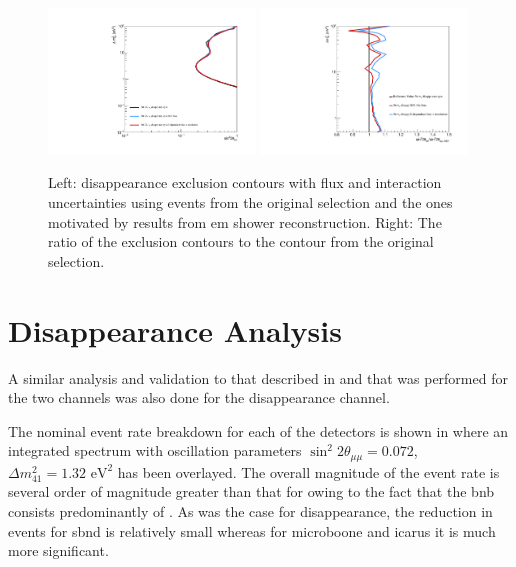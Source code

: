 \begin{figure}[h!]
    \centering
    \includegraphics[width = 0.49\textwidth]{figures-chap6/exclusion_contours/bias/nue_disapp_03d1.pdf}
    \includegraphics[width = 0.49\textwidth]{figures-chap6/exclusion_contours/bias/nue_disapp_03d1_ratio.pdf}
    \caption[\nue disappearance exclusion contours using events from the selection motivated by \gls{em} shower reconstruction.]{Left: \nue disappearance exclusion contours with flux and interaction uncertainties using events from the original selection and the ones motivated by results from \gls{em} shower reconstruction. Right: The ratio of the exclusion contours to the contour from the original selection.}
    \label{fig:nue_disapp_bias}
\end{figure}

\newpage
\section{\texorpdfstring{\numu Disappearance Analysis}{numu Disappearance Analysis}}

A similar analysis and validation to that described in   and  that was performed for the two \nue channels was also done for the \numu disappearance channel.

The nominal event rate breakdown for each of the detectors is shown in  where an integrated spectrum with oscillation parameters $\sin^2{2\theta_{\mu \mu}} = 0.072$, $\Delta m^2_{41} = 1.32 \text{ eV}^2$ has been overlayed. The overall magnitude of the event rate is several order of magnitude greater than that for \nue owing to the fact that the \gls{bnb} consists predominantly of \numu. As was the case for \nue disappearance, the reduction in events for \gls{sbnd} is relatively small whereas for \gls{microboone} and \gls{icarus} it is much more significant.

